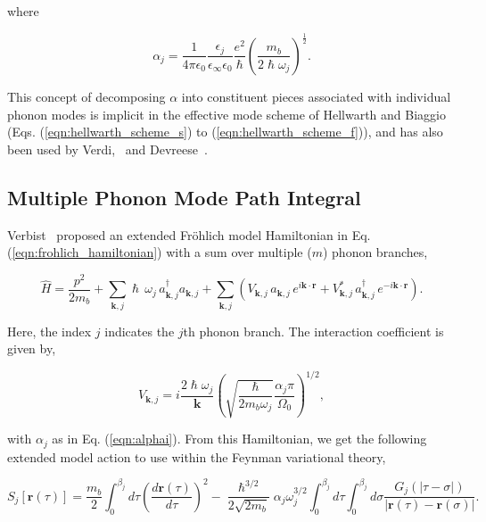 where

\begin{equation}
\alpha_j = \frac{1}{4\pi\epsilon_0}  \frac{\epsilon_j}{\epsilon_{\infty}\epsilon_{0}} \frac{e^2}{\hslash} \left( \frac{m_b}{2\hslash\omega_j} \right)^{\frac{1}{2}}.
    \label{eqn:alphai}
\end{equation}

This concept of decomposing $\alpha$ into constituent pieces associated with individual phonon modes is implicit in the effective mode scheme of Hellwarth and Biaggio (Eqs. (\ref{eqn:hellwarth_scheme_s}) to (\ref{eqn:hellwarth_scheme_f})), and has also been used by Verdi,~\cite{verbist_extended_1992} and Devreese~\cite{devreese_many-body_2010}.

\subsection{Multiple Phonon Mode Path Integral}
\label{subsec:3-1-1}

Verbist~\cite{verbist_extended_1992} proposed an extended Fr\"ohlich model Hamiltonian in Eq. (\ref{eqn:frohlich_hamiltonian}) with a sum over multiple ($m$) phonon branches,

\begin{equation}
    \hat{H} = \frac{p^2}{2m_b} + \sum_{\mathbf{k}, j} \hslash \, \omega_{j} \, a_{\mathbf{k}, j}^\dagger a_{\mathbf{k}, j}
    + \sum_{\mathbf{k}, j} ( V_{\mathbf{k}, j} \, a_{\mathbf{k}, j} \, e^{i\mathbf{k} \cdot \mathbf{r}} + V_{\mathbf{k}, j}^* \, a_{\mathbf{k}, j}^\dagger \, e^{-i\mathbf{k} \cdot \mathbf{r}}) .
\label{eqn:multifrohlich}
\end{equation}

Here, the index $j$ indicates the $j$th phonon branch. The interaction coefficient is given by,

\begin{equation}
    V_{\mathbf{k}, j} = i\frac{2 \hslash \omega_j}{\mathbf{k}} \left(\sqrt{\frac{\hslash}{2 m_b \omega_j}} \frac{\alpha_j \pi}{\Omega_0} \right)^{1/2},
\end{equation}

with $\alpha_j$ as in Eq. (\ref{eqn:alphai}). From this Hamiltonian, we get the following extended model action to use within the Feynman variational theory,

\begin{equation}
        S_j[\mathbf{r}(\tau)] =
        \frac{m_b}{2}\int^{\beta_j}_0 d\tau \left(\frac{d\mathbf{r}(\tau)}{d\tau}\right)^2 -
        \frac{\hslash^{3/2}}{2\sqrt{2 m_b}} \alpha_j \omega_{j}^{3/2} \int^{\beta_j}_0 d\tau \int^{\beta_j}_0 d\sigma \frac{G_j(|\tau - \sigma|)}{|\mathbf{r}(\tau) - \mathbf{r}(\sigma)|} .
\label{eqn:multiaction}
\end{equation}

